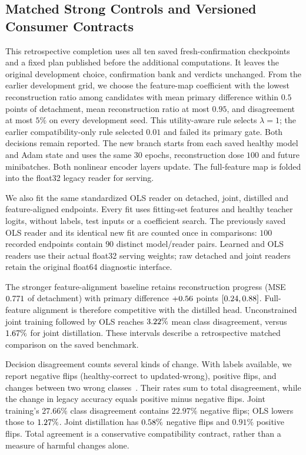 \subsection{Matched Strong Controls and Versioned Consumer Contracts}\label{app:completion_controls}

This retrospective completion uses all ten saved fresh-confirmation checkpoints
and a fixed plan published before the additional computations. It leaves the
original development choice, confirmation bank and verdicts unchanged.
From the earlier development grid, we choose the feature-map coefficient with
the lowest reconstruction ratio among candidates with mean primary difference
within $0.5$ points of detachment, mean reconstruction ratio at most $0.95$,
and disagreement at most $5\%$ on every development seed. This utility-aware
rule selects $\lambda=1$; the earlier compatibility-only rule selected
$0.01$ and failed its primary gate. Both decisions remain reported.
The new branch starts from each saved healthy model and Adam state and uses
the same $30$ epochs, reconstruction dose $100$ and future minibatches.
Both nonlinear encoder layers update. The full-feature map is folded into
the float32 legacy reader for serving.

We also fit the same standardized OLS reader on detached, joint, distilled and
feature-aligned endpoints. Every fit uses fitting-set features and healthy
teacher logits, without labels, test inputs or a coefficient search. The
previously saved OLS reader and its identical new fit are counted once in
comparisons: $100$ recorded endpoints contain $90$ distinct model/reader pairs.
Learned and OLS readers use their actual float32 serving weights; raw detached
and joint readers retain the original float64 diagnostic interface.



The stronger feature-alignment baseline retains reconstruction progress
(MSE $0.771$ of detachment) with primary difference
$+0.56$ points $[0.24,0.88]$.
Full-feature alignment is therefore competitive with the distilled head. Unconstrained joint training followed
by OLS reaches $3.22\%$ mean class disagreement, versus
$1.67\%$ for joint distillation. These intervals describe a retrospective matched comparison on the saved benchmark.

Decision disagreement counts several kinds of change. With labels available,
we report negative flips (healthy-correct to updated-wrong), positive flips,
and changes between two wrong classes~\citep{yan2021positive}. Their rates sum
to total disagreement, while the change in legacy accuracy equals
positive minus negative flips. Joint training's $27.66\%$ class disagreement
contains $22.97\%$ negative flips; OLS lowers those to
$1.27\%$. Joint distillation has
$0.58\%$ negative flips and $0.91\%$ positive flips. Total
agreement is a conservative compatibility contract, rather than a measure of
harmful changes alone.

